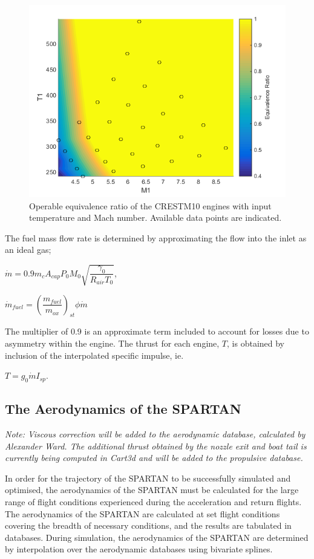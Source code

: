 \begin{figure}[ht]
	\centering
	\includegraphics[width=0.6\linewidth]{figures/3_vehicle_design/EquivalenceRatioInterp}
	\caption{Operable equivalence ratio of the CRESTM10 engines with input temperature and Mach number. Available data points are indicated.}
	\label{fig:EquivalenceRatioInterp}
\end{figure}
The fuel mass flow rate is determined by approximating the flow into the inlet as an ideal gas; 

$\dot{m} = 0.9 m_c A_{cap} P_0 M_0 \sqrt{\dfrac{\gamma_0}{R_{air} T_0}}$,

$\dot{m}_{fuel} = (\dfrac{m_{fuel}}{m_{ox}} )_{st} \phi \dot{m}$

The multiplier of 0.9 is an approximate term included to account for losses due to asymmetry within the engine\cite{Preller2018}. 
The thrust for each engine, $T$, is obtained by inclusion of the interpolated specific impulse, ie. 

$T = g_0\dot{m}I_{sp}$. 







		
		
		\subsection{The Aerodynamics of the SPARTAN}\label{sec:aero}
		
		\textit{Note: Viscous correction will be added to the aerodynamic database, calculated by Alexander Ward. The additional thrust obtained by the nozzle exit and boat tail is currently being computed in Cart3d and will be added to the propulsive database.}
		
		
In order for the trajectory of the SPARTAN to be successfully simulated and optimised, the aerodynamics of the SPARTAN must be calculated for the large range of flight conditions experienced during the acceleration and return flights. 
The aerodynamics of the SPARTAN are calculated at set flight conditions covering the breadth of necessary conditions, and the results are tabulated in databases. During simulation, the aerodynamics of the SPARTAN are determined by interpolation over the aerodynamic databases using bivariate splines. 


